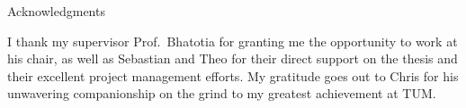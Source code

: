 \thispagestyle{empty}

\vspace*{20mm}

\begin{center}
    { Acknowledgments}
\end{center}

\vspace{10mm}

I thank my supervisor Prof.\ Bhatotia for granting me the opportunity to work at his chair, as well as Sebastian and
Theo for their direct support on the thesis and their excellent project management efforts. My gratitude goes out to
Chris for his unwavering companionship on the grind to my greatest achievement at TUM.

\cleardoublepage{}
